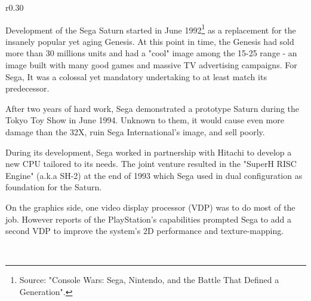 \begin{wrapfigure}[10]{r}{0.30\textwidth}{
\centering {}}
\end{wrapfigure}
Development of the Sega Saturn started in June 1992\footnote{Source: "Console Wars: Sega, Nintendo, and the Battle That Defined a Generation".} as a replacement for the insanely popular yet aging Genesis. At this point in time, the Genesis had sold more than 30 millions units and had a "cool" image among the 15-25 range - an image built with many good games and massive TV advertising campaigns. For Sega, It was a colossal yet mandatory undertaking to at least match its predecessor.\\
\label{saturn_port}
\par
After two years of hard work, Sega demonstrated a prototype Saturn during the Tokyo Toy Show in June 1994. Unknown to them, it would cause even more damage than the 32X, ruin Sega International's image, and sell poorly.\\
\par
During its development, Sega worked in partnership with Hitachi to develop a new CPU tailored to its needs. The joint venture resulted in the "SuperH RISC Engine" (a.k.a SH-2) at the end of 1993 which Sega used in dual configuration as foundation for the Saturn.\\
\par
 On the graphics side, one video display processor (VDP) was to do most of the job. However reports of the PlayStation's capabilities prompted Sega to add a second VDP to improve the system's 2D performance and texture-mapping.\\
\par
{}\\

